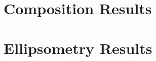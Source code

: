 %


\section{Composition Results}
\label{sup:Composition}



\section{Ellipsometry Results}
\label{sup:Ellipsometry}

